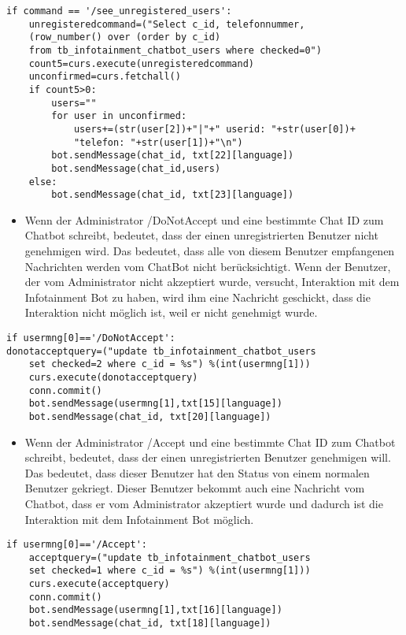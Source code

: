 \begin{lstlisting}[frame=single]
if command == '/see_unregistered_users':
	unregisteredcommand=("Select c_id, telefonnummer,
	(row_number() over (order by c_id) 
	from tb_infotainment_chatbot_users where checked=0")
	count5=curs.execute(unregisteredcommand)
	unconfirmed=curs.fetchall()
	if count5>0:
		users=""
		for user in unconfirmed:
			users+=(str(user[2])+"|"+" userid: "+str(user[0])+
			"telefon: "+str(user[1])+"\n")
		bot.sendMessage(chat_id, txt[22][language])
		bot.sendMessage(chat_id,users)
	else:
		bot.sendMessage(chat_id, txt[23][language])	
\end{lstlisting}
\begin{itemize}
	\item Wenn der Administrator /DoNotAccept und eine bestimmte Chat ID zum Chatbot schreibt, bedeutet, dass der einen unregistrierten Benutzer nicht genehmigen wird. Das bedeutet, dass alle von diesem Benutzer empfangenen Nachrichten werden vom ChatBot nicht berücksichtigt. Wenn der Benutzer, der vom Administrator nicht akzeptiert wurde, versucht, Interaktion mit dem Infotainment Bot zu haben, wird ihm eine Nachricht geschickt, dass die Interaktion nicht m\"oglich ist, weil er nicht genehmigt wurde.
\end{itemize}	
\begin{lstlisting}[frame=single]
if usermng[0]=='/DoNotAccept':
donotacceptquery=("update tb_infotainment_chatbot_users 
	set checked=2 where c_id = %s") %(int(usermng[1]))
	curs.execute(donotacceptquery)
	conn.commit()
	bot.sendMessage(usermng[1],txt[15][language])
	bot.sendMessage(chat_id, txt[20][language])
\end{lstlisting}
\begin{itemize}
	\item Wenn der Administrator /Accept und eine bestimmte Chat ID zum Chatbot schreibt, bedeutet, dass der einen unregistrierten Benutzer genehmigen will. Das bedeutet, dass dieser Benutzer hat den Status von einem normalen Benutzer gekriegt. Dieser Benutzer bekommt auch eine Nachricht vom Chatbot, dass er vom Administrator akzeptiert wurde und dadurch ist die Interaktion mit dem Infotainment Bot m\"oglich.
\end{itemize}	
\begin{lstlisting}[frame=single]
if usermng[0]=='/Accept':
	acceptquery=("update tb_infotainment_chatbot_users 
	set checked=1 where c_id = %s") %(int(usermng[1]))
	curs.execute(acceptquery)
	conn.commit()
	bot.sendMessage(usermng[1],txt[16][language])
	bot.sendMessage(chat_id, txt[18][language])
\end{lstlisting}

